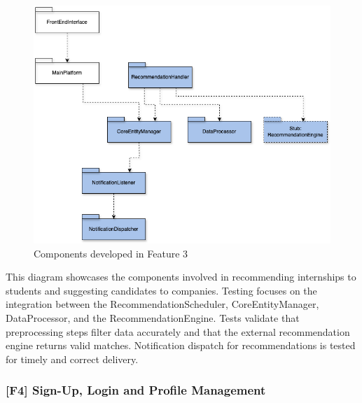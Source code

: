 \begin{figure}[H]
    \centering
    \includegraphics[width=\textwidth]{Images/implementation-testing-hierarchy_f3.png}
    \caption{Components developed in Feature 3}
    \label{fig:implementation_testing_f3}
\end{figure}

This diagram showcases the components involved in recommending internships to students and suggesting candidates to companies. Testing focuses on the integration between the RecommendationScheduler, CoreEntityManager, DataProcessor, and the RecommendationEngine. Tests validate that preprocessing steps filter data accurately and that the external recommendation engine returns valid matches. Notification dispatch for recommendations is tested for timely and correct delivery.

\subsubsection{[F4] Sign-Up, Login and Profile Management}

